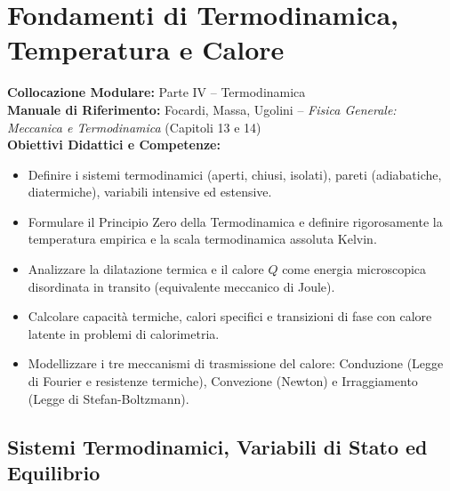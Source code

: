 \chapter{Fondamenti di Termodinamica, Temperatura e Calore}
\label{chap:termodinamica_fondamenti}

\begin{tcolorbox}[enhanced, breakable, colback=navyblue!4!white, colframe=navyblue!80!black,
    coltitle=white, fonttitle=\bfseries\sffamily, title={Quadro Sinottico del Capitolo 12},
    sharp corners, rounded corners=south, boxrule=1pt]
\textbf{Collocazione Modulare:} Parte IV -- Termodinamica\\
\textbf{Manuale di Riferimento:} Focardi, Massa, Ugolini -- \emph{Fisica Generale: Meccanica e Termodinamica} (Capitoli 13 e 14)\\
\textbf{Obiettivi Didattici e Competenze:}\par
\begin{itemize}
    \item Definire i sistemi termodinamici (aperti, chiusi, isolati), pareti (adiabatiche, diatermiche), variabili intensive ed estensive.
    \item Formulare il Principio Zero della Termodinamica e definire rigorosamente la temperatura empirica e la scala termodinamica assoluta Kelvin.
    \item Analizzare la dilatazione termica e il calore $Q$ come energia microscopica disordinata in transito (equivalente meccanico di Joule).
    \item Calcolare capacità termiche, calori specifici e transizioni di fase con calore latente in problemi di calorimetria.
    \item Modellizzare i tre meccanismi di trasmissione del calore: Conduzione (Legge di Fourier e resistenze termiche), Convezione (Newton) e Irraggiamento (Legge di Stefan-Boltzmann).
\end{itemize}
\end{tcolorbox}

\vspace{0.5em}

\section{Sistemi Termodinamici, Variabili di Stato ed Equilibrio}
\label{sec:sistemi_termodinamici}

